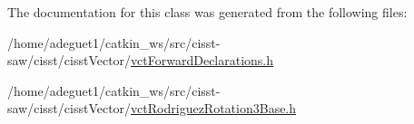 The documentation for this class was generated from the following files\-:\begin{DoxyCompactItemize}
\item 
/home/adeguet1/catkin\-\_\-ws/src/cisst-\/saw/cisst/cisst\-Vector/\hyperlink{vct_forward_declarations_8h}{vct\-Forward\-Declarations.\-h}\item 
/home/adeguet1/catkin\-\_\-ws/src/cisst-\/saw/cisst/cisst\-Vector/\hyperlink{vct_rodriguez_rotation3_base_8h}{vct\-Rodriguez\-Rotation3\-Base.\-h}\end{DoxyCompactItemize}
